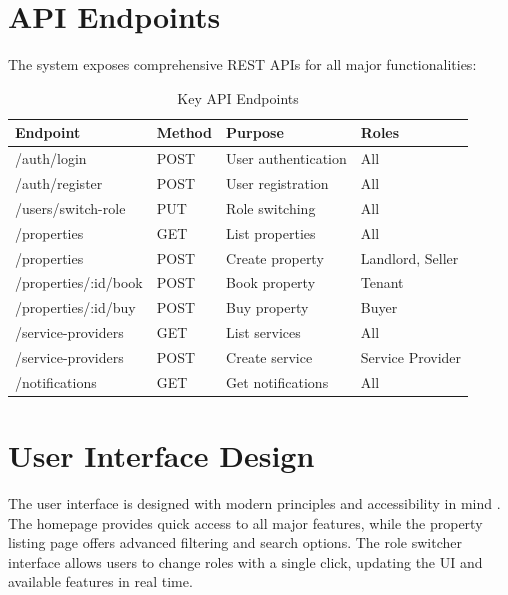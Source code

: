 \documentclass[conference]{IEEEtran}
\begin{document}
\section{API Endpoints}
The system exposes comprehensive REST APIs for all major functionalities:

\begin{table}[ht]
\centering
\caption{Key API Endpoints}
\begin{tabular}{|l|l|l|l|}
\hline
\textbf{Endpoint} & \textbf{Method} & \textbf{Purpose} & \textbf{Roles} \\
\hline
/auth/login & POST & User authentication & All \\
\hline
/auth/register & POST & User registration & All \\
\hline
/users/switch-role & PUT & Role switching & All \\
\hline
/properties & GET & List properties & All \\
\hline
/properties & POST & Create property & Landlord, Seller \\
\hline
/properties/:id/book & POST & Book property & Tenant \\
\hline
/properties/:id/buy & POST & Buy property & Buyer \\
\hline
/service-providers & GET & List services & All \\
\hline
/service-providers & POST & Create service & Service Provider \\
\hline
/notifications & GET & Get notifications & All \\
\hline
\end{tabular}
\end{table}

\section{User Interface Design}
The user interface is designed with modern principles and accessibility in mind \cite{user_experience}. The homepage provides quick access to all major features, while the property listing page offers advanced filtering and search options. The role switcher interface allows users to change roles with a single click, updating the UI and available features in real time.

\end{document}
